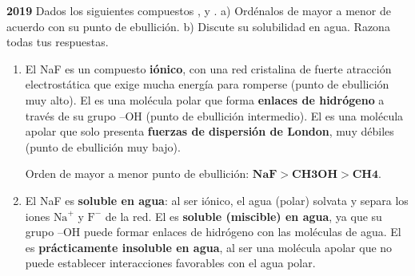 \begin{exerciseEVAU}
    \textbf{2019} Dados los siguientes compuestos ,  y . a) Ordénalos de mayor a menor de acuerdo con su punto de ebullición. b) Discute su solubilidad en agua. Razona todas tus respuestas.

    \begin{solu}


        \begin{enumerate}[label=\letraminuscula]
            \item El NaF es un compuesto \textbf{iónico}, con una red cristalina de fuerte atracción electrostática que exige mucha energía para romperse (punto de ebullición muy alto). El  es una molécula polar que forma \textbf{enlaces de hidrógeno} a través de su grupo --OH (punto de ebullición intermedio). El  es una molécula apolar que solo presenta \textbf{fuerzas de dispersión de London}, muy débiles (punto de ebullición muy bajo).

            Orden de mayor a menor punto de ebullición: \(\textbf{NaF} > \textbf{CH3OH} > \textbf{CH4}\).

            \item El NaF es \textbf{soluble en agua}: al ser iónico, el agua (polar) solvata y separa los iones \(\text{Na}^+\) y \(\text{F}^-\) de la red. El  es \textbf{soluble (miscible) en agua}, ya que su grupo --OH puede formar enlaces de hidrógeno con las moléculas de agua. El  es \textbf{prácticamente insoluble en agua}, al ser una molécula apolar que no puede establecer interacciones favorables con el agua polar.
        \end{enumerate}
    \end{solu}
\end{exerciseEVAU}

